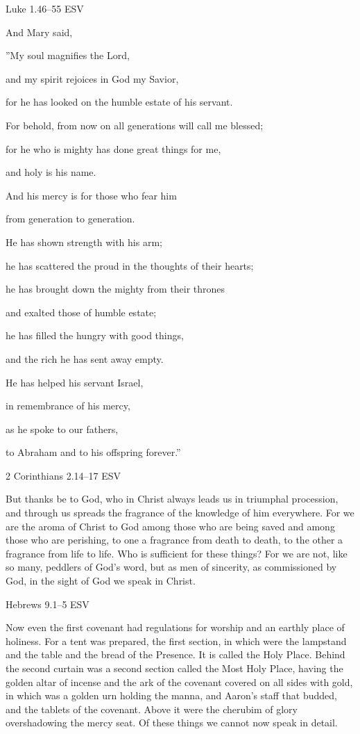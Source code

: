 \documentclass[
]{article}
\newcommand{\RL}[1]{\beginR #1\endR}
\begin{document}
Luke 1.46--55 ESV

And Mary said,

\RL{''}My soul magnifies the Lord,

and my spirit rejoices in God my Savior,

for he has looked on the humble estate of his servant.

For behold, from now on all generations will call me blessed;

for he who is mighty has done great things for me,

and holy is his name.

And his mercy is for those who fear him

from generation to generation.

He has shown strength with his arm;

he has scattered the proud in the thoughts of their hearts;

he has brought down the mighty from their thrones

and exalted those of humble estate;

he has filled the hungry with good things,

and the rich he has sent away empty.

He has helped his servant Israel,

in remembrance of his mercy,

as he spoke to our fathers,

to Abraham and to his offspring forever.''

2 Corinthians 2.14--17 ESV

But thanks be to God, who in Christ always leads us in triumphal
procession, and through us spreads the fragrance of the knowledge of him
everywhere. For we are the aroma of Christ to God among those who are
being saved and among those who are perishing, to one a fragrance from
death to death, to the other a fragrance from life to life. Who is
sufficient for these things? For we are not, like so many, peddlers of
God\RL{'}s word, but as men of sincerity, as commissioned by God, in the
sight of God we speak in Christ.

Hebrews 9.1--5 ESV

Now even the first covenant had regulations for worship and an earthly
place of holiness. For a tent was prepared, the first section, in which
were the lampstand and the table and the bread of the Presence. It is
called the Holy Place. Behind the second curtain was a second section
called the Most Holy Place, having the golden altar of incense and the
ark of the covenant covered on all sides with gold, in which was a
golden urn holding the manna, and Aaron\RL{'}s staff that budded, and
the tablets of the covenant. Above it were the cherubim of glory
overshadowing the mercy seat. Of these things we cannot now speak in
detail.
\end{document}
